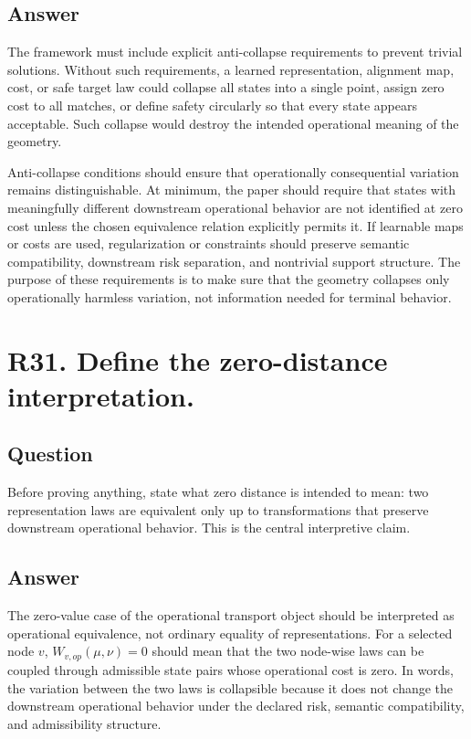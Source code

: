 \documentclass[11pt,a4paper]{article}
\begin{document}
\subsection*{Answer}

The framework must include explicit anti-collapse requirements to prevent trivial solutions. Without such requirements, a learned representation, alignment map, cost, or safe target law could collapse all states into a single point, assign zero cost to all matches, or define safety circularly so that every state appears acceptable. Such collapse would destroy the intended operational meaning of the geometry.

Anti-collapse conditions should ensure that operationally consequential variation remains distinguishable. At minimum, the paper should require that states with meaningfully different downstream operational behavior are not identified at zero cost unless the chosen equivalence relation explicitly permits it. If learnable maps or costs are used, regularization or constraints should preserve semantic compatibility, downstream risk separation, and nontrivial support structure. The purpose of these requirements is to make sure that the geometry collapses only operationally harmless variation, not information needed for terminal behavior.

\section*{R31. Define the zero-distance interpretation.}

\subsection*{Question}

Before proving anything, state what zero distance is intended to mean: two representation laws are equivalent only up to transformations that preserve downstream operational behavior. This is the central interpretive claim.

\subsection*{Answer}

The zero-value case of the operational transport object should be interpreted as operational equivalence, not ordinary equality of representations. For a selected node \(v\), \(W_{v,op}(\mu,\nu) = 0\) should mean that the two node-wise laws can be coupled through admissible state pairs whose operational cost is zero. In words, the variation between the two laws is collapsible because it does not change the downstream operational behavior under the declared risk, semantic compatibility, and admissibility structure.
\end{document}
